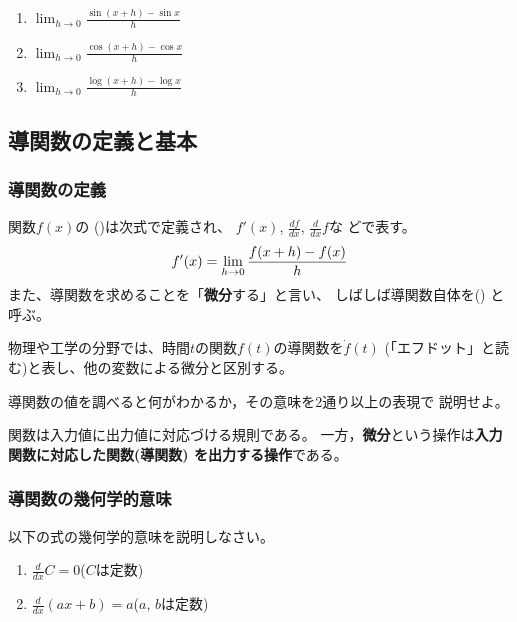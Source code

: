 \documentclass[twocolumn,11pt]{jarticle}
\begin{document}
\begin{enumerate}
\item
  \label{litem:dsinx}$\displaystyle\lim_{h\to0}\frac{\sin(x+h)-\sin x}{h}$
\item
  \label{litem:dcosx}$\displaystyle\lim_{h\to0}\frac{\cos(x+h)-\cos x}{h}$
\item
  \label{litem:dlogx}$\displaystyle\lim_{h\to0}\frac{\log(x+h)-\log x}{h}$
\end{enumerate}

\subsection{導関数の定義と基本}

\subsubsection{導関数の定義}
関数$f(x)$の
()は次式で定義され、
$f'(x)$, $\displaystyle\frac{df}{dx}$, $\displaystyle\frac{d}{dx}f$な
どで表す。
\begin{align}
  f'(x)=\lim_{h\to 0}\frac{f(x+h)-f(x)}{h}\notag
\end{align}
また、導関数を求めることを「\textbf{微分}する」と言い、
しばしば導関数自体を()
と呼ぶ。

物理や工学の分野では、時間$t$の関数$f(t)$の導関数を$\dot{f}(t)$
(「エフドット」と読む)と表し、他の変数による微分と区別する。

\nquestion
導関数の値を調べると何がわかるか，その意味を2通り以上の表現で
説明せよ。

\comment
関数は入力値に出力値に対応づける規則である。
一方，\textbf{微分}という操作は\textbf{入力関数に対応した関数(導関数)
  を出力する操作}である。

\subsubsection{導関数の幾何学的意味}

\nquestion
以下の式の幾何学的意味を説明しなさい。
\begin{enumerate}
\item $\displaystyle \frac{d}{dx}C=0$\quad ($C$は定数)
\item $\displaystyle \frac{d}{dx}(ax+b)=a$\quad ($a$, $b$は定数)
\end{enumerate}
\end{document}
